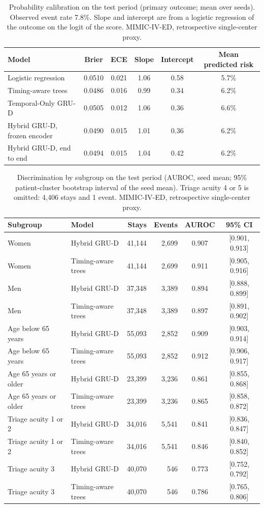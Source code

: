 \begin{table}[t]
\centering
\caption{Probability calibration on the test period (primary outcome; mean over seeds). Observed event rate 7.8\%. Slope and intercept are from a logistic regression of the outcome on the logit of the score. MIMIC-IV-ED, retrospective single-center proxy.}
\label{tab:calibration}
\begin{tabular}{lccccc}
\toprule
Model & Brier & ECE & Slope & Intercept & Mean predicted risk \\
\midrule
Logistic regression & 0.0510 & 0.021 & 1.06 & 0.58 & 5.7\% \\
Timing-aware trees & 0.0486 & 0.016 & 0.99 & 0.34 & 6.2\% \\
Temporal-Only GRU-D & 0.0505 & 0.012 & 1.06 & 0.36 & 6.6\% \\
Hybrid GRU-D, frozen encoder & 0.0490 & 0.015 & 1.01 & 0.36 & 6.2\% \\
Hybrid GRU-D, end to end & 0.0494 & 0.015 & 1.04 & 0.42 & 6.2\% \\
\bottomrule
\end{tabular}
\end{table}

\begin{table}[t]
\centering
\caption{Discrimination by subgroup on the test period (AUROC, seed mean; 95\% patient-cluster bootstrap interval of the seed mean). Triage acuity 4 or 5 is omitted: 4,406 stays and 1 event. MIMIC-IV-ED, retrospective single-center proxy.}
\label{tab:subgroups}
\begin{tabular}{llrrcc}
\toprule
Subgroup & Model & Stays & Events & AUROC & 95\% CI \\
\midrule
Women & Hybrid GRU-D & 41,144 & 2,699 & 0.907 & [0.901, 0.913] \\
Women & Timing-aware trees & 41,144 & 2,699 & 0.911 & [0.905, 0.916] \\
Men & Hybrid GRU-D & 37,348 & 3,389 & 0.894 & [0.888, 0.899] \\
Men & Timing-aware trees & 37,348 & 3,389 & 0.897 & [0.891, 0.902] \\
Age below 65 years & Hybrid GRU-D & 55,093 & 2,852 & 0.909 & [0.903, 0.914] \\
Age below 65 years & Timing-aware trees & 55,093 & 2,852 & 0.912 & [0.906, 0.917] \\
Age 65 years or older & Hybrid GRU-D & 23,399 & 3,236 & 0.861 & [0.855, 0.868] \\
Age 65 years or older & Timing-aware trees & 23,399 & 3,236 & 0.865 & [0.858, 0.872] \\
Triage acuity 1 or 2 & Hybrid GRU-D & 34,016 & 5,541 & 0.841 & [0.836, 0.847] \\
Triage acuity 1 or 2 & Timing-aware trees & 34,016 & 5,541 & 0.846 & [0.840, 0.852] \\
Triage acuity 3 & Hybrid GRU-D & 40,070 & 546 & 0.773 & [0.752, 0.792] \\
Triage acuity 3 & Timing-aware trees & 40,070 & 546 & 0.786 & [0.765, 0.806] \\
\bottomrule
\end{tabular}
\end{table}
